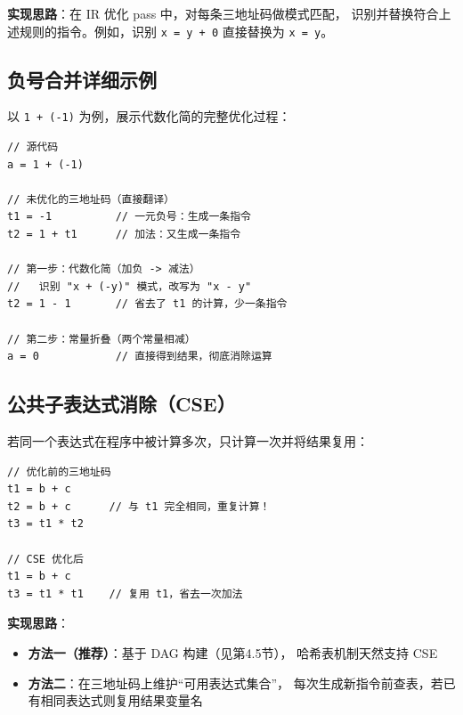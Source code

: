 \documentclass[12pt, a4paper]{ctexart}
\begin{document}
\textbf{实现思路}：在 IR 优化 pass 中，对每条三地址码做模式匹配，
识别并替换符合上述规则的指令。例如，识别 \texttt{x = y + 0} 直接替换为 \texttt{x = y}。

\subsection{负号合并详细示例}

以 \texttt{1 + (-1)} 为例，展示代数化简的完整优化过程：

\begin{lstlisting}[caption={\texttt{1 + (-1)} 的分步优化过程}]
// 源代码
a = 1 + (-1)

// 未优化的三地址码（直接翻译）
t1 = -1          // 一元负号：生成一条指令
t2 = 1 + t1      // 加法：又生成一条指令

// 第一步：代数化简（加负 -> 减法）
//   识别 "x + (-y)" 模式，改写为 "x - y"
t2 = 1 - 1       // 省去了 t1 的计算，少一条指令

// 第二步：常量折叠（两个常量相减）
a = 0            // 直接得到结果，彻底消除运算
\end{lstlisting}

\subsection{公共子表达式消除（CSE）}

若同一个表达式在程序中被计算多次，只计算一次并将结果复用：

\begin{lstlisting}[caption={CSE 优化示例}]
// 优化前的三地址码
t1 = b + c
t2 = b + c      // 与 t1 完全相同，重复计算！
t3 = t1 * t2

// CSE 优化后
t1 = b + c
t3 = t1 * t1    // 复用 t1，省去一次加法
\end{lstlisting}

\textbf{实现思路}：

\begin{itemize}[noitemsep]
  \item \textbf{方法一（推荐）}：基于 DAG 构建（见第4.5节），
        哈希表机制天然支持 CSE
  \item \textbf{方法二}：在三地址码上维护``可用表达式集合''，
        每次生成新指令前查表，若已有相同表达式则复用结果变量名
\end{itemize}
\end{document}
